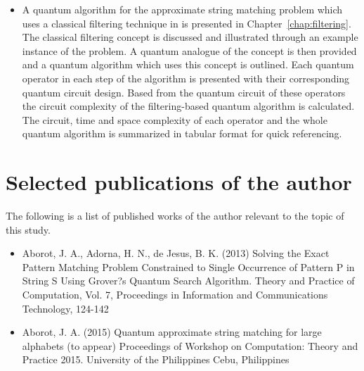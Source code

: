 \begin{itemize}
\item A quantum algorithm for the approximate string matching problem which uses a classical filtering technique in \cite{Amir2004} is presented in Chapter~\ref{chap:filtering}. The classical filtering concept is discussed and illustrated through an example instance of the problem. A quantum analogue of the concept is then provided and a quantum algorithm which uses this concept is outlined. Each quantum operator in each step of the algorithm is presented with their corresponding quantum circuit design. Based from the quantum circuit of these operators the circuit complexity of the filtering-based quantum algorithm is calculated. The circuit, time and space complexity of each operator and the whole quantum algorithm is summarized in tabular format for quick referencing.

\end{itemize}


\section*{Selected publications of the author}
The following is a list of published works of the author relevant to the topic of this study.
\begin{itemize}
\item Aborot, J. A., Adorna, H. N., de Jesus, B. K. (2013) Solving the Exact Pattern Matching Problem Constrained to Single Occurrence of Pattern P in String S Using Grover?s Quantum Search Algorithm. Theory and Practice of Computation, Vol. 7, Proceedings in Information and Communications Technology, 124-142
\item Aborot, J. A. (2015) Quantum approximate string matching for large alphabets (to appear) Proceedings of Workshop on Computation: Theory and Practice 2015. University of the Philippines Cebu, Philippines
\end{itemize}

